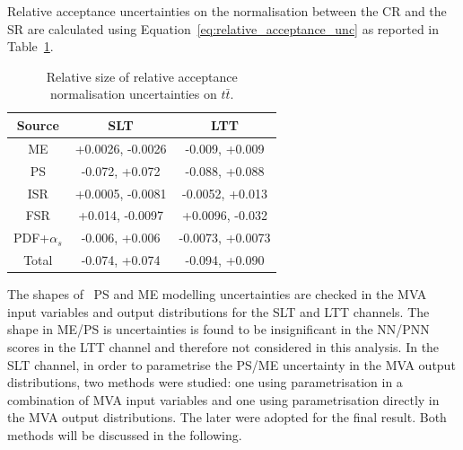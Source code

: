 
   
  


Relative acceptance uncertainties on the normalisation between the CR and the SR
are calculated using Equation~\ref{eq:relative_acceptance_unc} 
as reported in Table~\ref{sec:systs:tab:systematics_normalisations_ttbar}.


\begin{table}
\centering
\small
\begin{tabular}{|c|c|c|}
\hline
Source & SLT & LTT \\
\hline
ME & +0.0026, -0.0026 & -0.009, +0.009 \\
PS & -0.072, +0.072 & -0.088, +0.088 \\
ISR & +0.0005, -0.0081 & -0.0052, +0.013 \\
FSR & +0.014, -0.0097 & +0.0096, -0.032 \\
PDF+$\alpha_s$ & -0.006, +0.006 & -0.0073, +0.0073 \\
Total & -0.074, +0.074 & -0.094, +0.090 \\
\hline
\end{tabular}
\caption{Relative size of relative acceptance 
normalisation uncertainties on $t\bar{t}$.}
\label{sec:systs:tab:systematics_normalisations_ttbar}
\end{table}


The shapes of \ttbar\ PS and ME modelling uncertainties
are checked in the MVA input variables and output distributions 
for the SLT and LTT channels. The shape in ME/PS is uncertainties 
is found to be 
insignificant in the NN/PNN scores in the LTT channel and 
therefore not considered in this analysis.
In the SLT channel, in order to parametrise the PS/ME uncertainty in the MVA output distributions,
two methods were studied: one using parametrisation in
a combination of MVA input variables and one using parametrisation 
directly in the MVA output distributions.
The later were adopted for the final result. Both methods
will be discussed in the following. 


